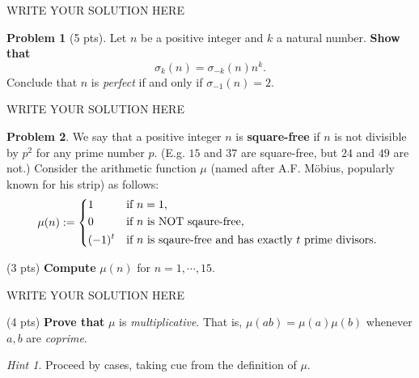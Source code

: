 \documentclass[11pt]{article}
\theoremstyle{plain}
\theoremstyle{definition}
\newtheorem{problem}{Problem}
\theoremstyle{remark}
\newtheorem*{hint}{Hint}
\numberwithin{equation}{problem}
\begin{document}
\begin{solution} %
WRITE YOUR SOLUTION HERE
\end{solution}\clearpage %


\begin{problem}[5 pts]
	Let $n$ be a positive integer and $k$ a natural number. 
	\textbf{Show that} 
	\[
		\sigma_k(n) = \sigma_{-k}(n)n^k.
	\]
	Conclude that $n$ is \emph{perfect} if and only if $\sigma_{-1}(n) = 2$.
\end{problem}
		
\begin{solution} %
WRITE YOUR SOLUTION HERE
\end{solution}\clearpage %


\begin{problem}
	We say that a positive integer $n$ is \textbf{square-free} if $n$ is not divisible by $p^2$ for any prime number $p$. (E.g. $15$ and $37$ are square-free, but $24$ and $49$ are not.) 
	Consider the arithmetic function $\mu$ (named after A.F. M\"obius, popularly known for his strip) as follows:
	\[
		\mu(n) := 
		\begin{dcases*}
			1 & if $n=1$,\\
			0 & if $n$ is NOT sqaure-free,\\
			(-1)^{t} & if $n$ is sqaure-free and has exactly $t$ prime divisors.
		\end{dcases*}
	\]
	\begin{listinprob}
		\item (3 pts) \textbf{Compute} $\mu(n)$ for $n=1,\cdots,15$.
		
\begin{solution} %
WRITE YOUR SOLUTION HERE
\end{solution}\clearpage %

		\item (4 pts) \textbf{Prove that} $\mu$ is \emph{multiplicative}. That is, $\mu(ab)=\mu(a)\mu(b)$ whenever $a,b$ are \emph{coprime}.
		\begin{hint}
			Proceed by cases, taking cue from the definition of $\mu$.
		\end{hint}
	\end{listinprob}
\end{problem}
		
\end{document}
